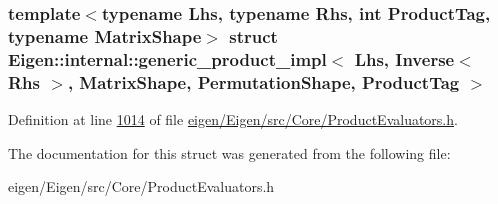 \subsubsection*{template$<$typename Lhs, typename Rhs, int Product\+Tag, typename Matrix\+Shape$>$\newline
struct Eigen\+::internal\+::generic\+\_\+product\+\_\+impl$<$ Lhs, Inverse$<$ Rhs $>$, Matrix\+Shape, Permutation\+Shape, Product\+Tag $>$}



Definition at line \hyperlink{eigen_2_eigen_2src_2_core_2_product_evaluators_8h_source_l01014}{1014} of file \hyperlink{eigen_2_eigen_2src_2_core_2_product_evaluators_8h_source}{eigen/\+Eigen/src/\+Core/\+Product\+Evaluators.\+h}.



The documentation for this struct was generated from the following file\+:\begin{DoxyCompactItemize}
\item 
eigen/\+Eigen/src/\+Core/\+Product\+Evaluators.\+h\end{DoxyCompactItemize}
